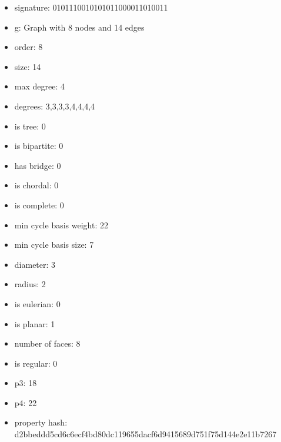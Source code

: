 \begin{itemize}
\item signature: 0101110010101011000011010011
\item g: Graph with 8 nodes and 14 edges
\item order: 8
\item size: 14
\item max degree: 4
\item degrees: 3,3,3,3,4,4,4,4
\item is tree: 0
\item is bipartite: 0
\item has bridge: 0
\item is chordal: 0
\item is complete: 0
\item min cycle basis weight: 22
\item min cycle basis size: 7
\item diameter: 3
\item radius: 2
\item is eulerian: 0
\item is planar: 1
\item number of faces: 8
\item is regular: 0
\item p3: 18
\item p4: 22
\item property hash: d2bbeddd5cd6c6ecf4bd80dc119655dacf6d9415689d751f75d144e2e11b7267
\end{itemize}
\newpage
\begin{figure}
\end{figure}
